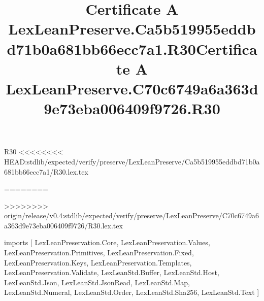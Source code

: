 \begin{lexlean}{R30}
<<<<<<<< HEAD:stdlib/expected/verify/preserve/LexLeanPreserve/Ca5b519955eddbd71b0a681bb66ecc7a1/R30.lex.tex
\title{Certificate A LexLeanPreserve.Ca5b519955eddbd71b0a681bb66ecc7a1.R30}
========
\title{Certificate A LexLeanPreserve.C70c6749a6a363d9e73eba006409f9726.R30}
>>>>>>>> origin/release/v0.4:stdlib/expected/verify/preserve/LexLeanPreserve/C70c6749a6a363d9e73eba006409f9726/R30.lex.tex
\begin{coremodule}
imports [
  LexLeanPreservation.Core,
  LexLeanPreservation.Values,
  LexLeanPreservation.Primitives,
  LexLeanPreservation.Fixed,
  LexLeanPreservation.Keys,
  LexLeanPreservation.Templates,
  LexLeanPreservation.Validate,
  LexLeanStd.Buffer,
  LexLeanStd.Host,
  LexLeanStd.Json,
  LexLeanStd.JsonRead,
  LexLeanStd.Map,
  LexLeanStd.Numeral,
  LexLeanStd.Order,
  LexLeanStd.Sha256,
  LexLeanStd.Text
]


\end{coremodule}
\end{lexlean}
